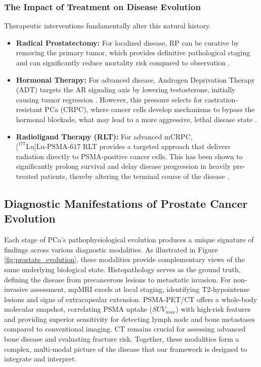 \documentclass[11pt, a4paper]{article}
\begin{document}
\subsubsection{The Impact of Treatment on Disease Evolution}
Therapeutic interventions fundamentally alter this natural history.
\begin{itemize}
    \item \textbf{Radical Prostatectomy:} For localized disease, RP can be curative by removing the primary tumor, which provides definitive pathological staging and can significantly reduce mortality risk compared to observation \cite{LuoYi2019, HerlemannCowan2024, LeyhBannurahDellOglio2019}.
    \item \textbf{Hormonal Therapy:} For advanced disease, Androgen Deprivation Therapy (ADT) targets the AR signaling axis by lowering testosterone, initially causing tumor regression \cite{MartinCaraballo2024, UnknownAuthor2014, BellmuntKheoh2016}. However, this pressure selects for castration-resistant PCa (CRPC), where cancer cells develop mechanisms to bypass the hormonal blockade, what may lead to a more aggressive, lethal disease state \cite{MartinCaraballo2024, UnknownAuthor2014}.
    \item \textbf{Radioligand Therapy (RLT):} For advanced mCRPC, $\text{[}^{177}\text{Lu]}\text{Lu-PSMA-617}$ RLT provides a targeted approach that delivers radiation directly to PSMA-positive cancer cells. This has been shown to significantly prolong survival and delay disease progression in heavily pre-treated patients, thereby altering the terminal course of the disease \cite{FizaziHerrmann2023, Keam2022}.
\end{itemize}

\subsection{Diagnostic Manifestations of Prostate Cancer Evolution}
Each stage of PCa's pathophysiological evolution produces a unique signature of findings across various diagnostic modalities. As illustrated in Figure \ref{fig:prostate_evolution}, these modalities provide complementary views of the same underlying biological state. Histopathology serves as the ground truth, defining the disease from precancerous lesions to metastatic invasion. For non-invasive assessment, mpMRI excels at local staging, identifying T2-hypointense lesions and signs of extracapsular extension. PSMA-PET/CT offers a whole-body molecular snapshot, correlating PSMA uptake ($SUV_{max}$) with high-risk features and providing superior sensitivity for detecting lymph node and bone metastases compared to conventional imaging. CT remains crucial for assessing advanced bone disease and evaluating fracture risk. Together, these modalities form a complex, multi-modal picture of the disease that our framework is designed to integrate and interpret.
\end{document}
